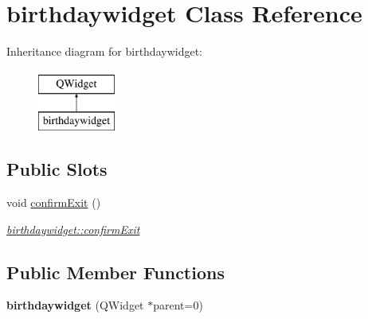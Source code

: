 \hypertarget{classbirthdaywidget}{\section{birthdaywidget Class Reference}
\label{classbirthdaywidget}
}
Inheritance diagram for birthdaywidget\-:\begin{figure}[H]
\begin{center}
\leavevmode
\includegraphics[height=2.000000cm]{classbirthdaywidget}
\end{center}
\end{figure}
\subsection*{Public Slots}
\begin{DoxyCompactItemize}
\item 
void \hyperlink{classbirthdaywidget_a099d4cbfc1b9bb95dd358325498832f8}{confirm\-Exit} ()
\begin{DoxyCompactList}\small\item\em \hyperlink{classbirthdaywidget_a099d4cbfc1b9bb95dd358325498832f8}{birthdaywidget\-::confirm\-Exit} \end{DoxyCompactList}\end{DoxyCompactItemize}
\subsection*{Public Member Functions}
\begin{DoxyCompactItemize}
\item 
\hypertarget{classbirthdaywidget_af8dcaa27ab4934036d0f3829c9434005}{{\bfseries birthdaywidget} (Q\-Widget $\ast$parent=0)}\label{classbirthdaywidget_af8dcaa27ab4934036d0f3829c9434005}

\end{DoxyCompactItemize}
